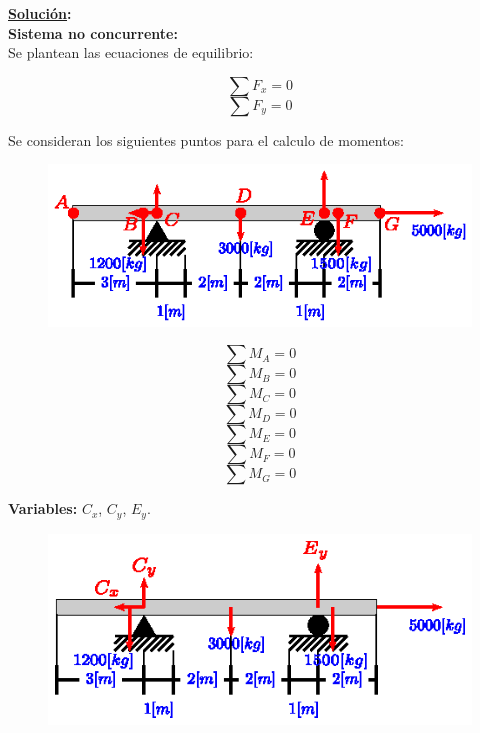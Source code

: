 \documentclass[letter,10pt,twoside]{article}
\begin{document}
\textbf{\underline{Solución}:} \\

\textbf{Sistema no concurrente:} \\
Se plantean las ecuaciones de equilibrio:

\begin{equation*}
    \sum{F_x} = 0
\end{equation*}
\begin{equation*}
    \sum{F_y} = 0
\end{equation*}

Se consideran los siguientes puntos para el calculo de momentos:

\begin{figure}[H]
\centering
\includegraphics[scale=1.8]{resources/g07.eps}
\end{figure}

\begin{equation*}
    \sum{M_A} = 0
\end{equation*}
\begin{equation*}
    \sum{M_B} = 0
\end{equation*}
\begin{equation*}
    \sum{M_C} = 0
\end{equation*}
\begin{equation*}
    \sum{M_D} = 0
\end{equation*}
\begin{equation*}
    \sum{M_E} = 0
\end{equation*}
\begin{equation*}
    \sum{M_F} = 0
\end{equation*}
\begin{equation*}
    \sum{M_G} = 0
\end{equation*}

\textbf{Variables:} $C_x$, $C_y$, $E_y$.
\\

\begin{figure}[H]
\centering
\includegraphics[scale=1.8]{resources/h07.eps}
\end{figure}
\end{document}
